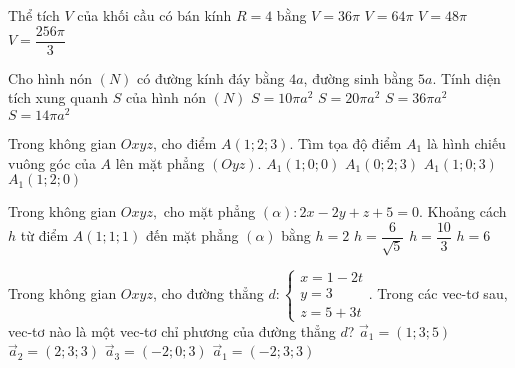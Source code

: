 \begin{ex}%
	Thể tích $V$ của khối cầu có bán kính $R=4$ bằng 
	\choice
	{$V=36\pi$}
	{$V=64\pi$}
	{$V=48\pi$}
	{\True $V=\dfrac{256\pi}{3}$}
\end{ex}

\begin{ex}%
	Cho hình nón $(N)$ có đường kính đáy bằng $4a$, đường sinh bằng $5a$. Tính diện tích xung quanh $S$ của hình nón $(N)$
	\choice
	{\True $S=10\pi a^2$}
	{$S=20\pi a^2$}
	{$S=36\pi a^2$}
	{$S=14\pi a^2$}
\end{ex}

\begin{ex}%
	Trong không gian $Oxyz$, cho điểm $A(1;2;3)$. Tìm tọa độ điểm $A_1$ là hình chiếu vuông góc của $A$ lên mặt phẳng $(Oyz)$.
	\choice
	{$A_1(1;0;0)$}
	{\True $A_1(0;2;3)$}
	{$A_1(1;0;3)$}
	{$A_1(1;2;0)$}
\end{ex}

\begin{ex}%
	Trong không gian $Oxyz,$ cho mặt phẳng $(\alpha):2x-2y+z+5=0$. Khoảng cách $h$ từ điểm $A(1;1;1)$ đến mặt phẳng $(\alpha)$ bằng
	\choice
	{\True $h=2$}
	{$h=\dfrac{6}{\sqrt{5}}$}
	{$h=\dfrac{10}{3}$}
	{$h=6$}
\end{ex}

\begin{ex}%
	Trong không gian $Oxyz$, cho đường thẳng $d:\begin{cases}x=1-2t \\ y=3 \\ z=5+3t  \end{cases}$. Trong các vec-tơ sau, vec-tơ nào là một vec-tơ chỉ phương của đường thẳng $d$?
	\choice
	{$\overrightarrow{a}_1=(1;3;5)$}
	{$\overrightarrow{a}_2=(2;3;3)$}
	{\True $\overrightarrow{a}_3=(-2;0;3)$}
	{$\overrightarrow{a}_1=(-2;3;3)$}
\end{ex}

